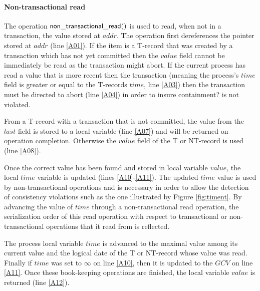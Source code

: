 \documentclass[11pt,letterpaper]{article}
\begin{document}
\paragraph{Non-transactional read}
The   operation  ${\sf   non\_transactional\_read()}$  is   used   to  read,
when not in a transaction, the value stored at
$\mathit{addr}$.
The  operation first  dereferences  the pointer  stored at  $\mathit{addr}$
(line \ref{A01}).
If the item is a T-record that was created by a 
transaction which  has not yet  committed then the $\mathit{value}$ field
cannot be immediately be read as the transaction might abort.
If the current process has read a value that is more recent then the transaction
(meaning the process's $\mathit{time}$ field is greater or equal to the T-records
$\mathit{time}$, line \ref{A03}) then the transaction must be directed to abort (line \ref{A04})
in order to insure containment? is not violated.

From a T-record with a transaction that is not committed, the value from the $\mathit{last}$
field is stored to a local variable (line \ref{A07}) and will be returned on operation completion.
Otherwise the $\mathit{value}$ field of the T or NT-record is used (line \ref{A08}).

Once  the correct value  has been  found  and stored  in local  variable 
$\mathit{value}$, the local $\mathit{time}$   
variable  is updated  (lines \ref{A10}-\ref{A11}).  The updated  $\mathit{time}$
value is used by non-transactional operations and is necessary in order to allow 
the detection of consistency 
violations such as the one illustrated by Figure \ref{fig:timent}. 
By advancing the value of $\mathit{time}$ 
through a non-transactional read operation, 
the serialization order of this read operation with 
respect to transactional or non-transactional operations 
that it read from is reflected.

The process local variable $\mathit{time}$ is advanced to 
the maximal 
value among its current 
value and the logical date of the T or NT-record whose value was read.
Finally if $\mathit{time}$ was set to $\infty$ on line \ref{A10}, then it is updated
to the $\mathit{GCV}$ on line \ref{A11}.
Once these book-keeping 
operations are finished, the local variable $\mathit{value}$
is returned (line \ref{A12}).
\end{document}
